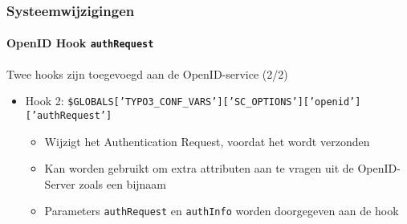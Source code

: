 \begin{frame}[fragile]
	\frametitle{Systeemwijzigingen}
	\framesubtitle{OpenID Hook \texttt{authRequest}}

	\lstset{basicstyle=\tiny\ttfamily}

	Twee hooks zijn toegevoegd aan de OpenID-service (2/2)

		\begin{itemize}

			\item Hook 2:\newline
				\smaller\smaller
					\texttt{\$GLOBALS['TYPO3\_CONF\_VARS']['SC\_OPTIONS']['openid']['authRequest']}
				\normalsize

				\begin{itemize}
					\item Wijzigt het Authentication Request, voordat het wordt verzonden
					\item Kan worden gebruikt om extra attributen aan te vragen uit de OpenID-Server zoals een bijnaam
					\item Parameters \texttt{authRequest} en \texttt{authInfo} worden doorgegeven aan de hook
				\end{itemize}

		\end{itemize}

\end{frame}

